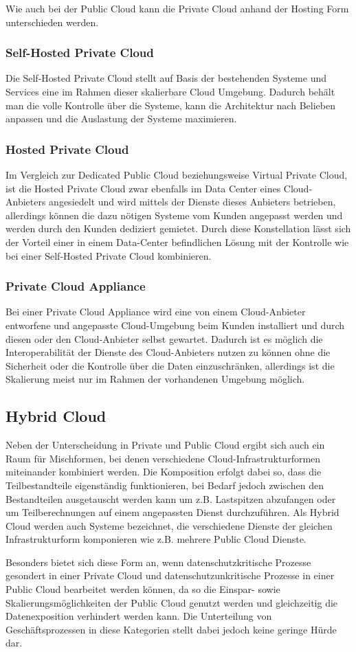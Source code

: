 Wie auch bei der Public Cloud kann die Private Cloud anhand der Hosting Form unterschieden werden.

\subsubsection{Self-Hosted Private Cloud}
Die Self-Hosted Private Cloud stellt auf Basis der bestehenden Systeme und Services eine im Rahmen dieser skalierbare Cloud Umgebung. Dadurch behält man die volle Kontrolle über die Systeme, kann die Architektur nach Belieben anpassen und die Auslastung der Systeme maximieren.

\subsubsection{Hosted Private Cloud}
Im Vergleich zur Dedicated Public Cloud beziehungsweise Virtual Private Cloud, ist die Hosted Private Cloud zwar ebenfalls im Data Center eines Cloud-Anbieters angesiedelt und wird mittels der Dienste dieses Anbieters betrieben, allerdings können die dazu nötigen Systeme vom Kunden angepasst werden und werden durch den Kunden dediziert gemietet. Durch diese Konstellation lässt sich der Vorteil einer in einem Data-Center befindlichen Lösung mit der Kontrolle wie bei einer Self-Hosted Private Cloud kombinieren.

\subsubsection{Private Cloud Appliance}
Bei einer Private Cloud Appliance wird eine von einem Cloud-Anbieter entworfene und angepasste Cloud-Umgebung beim Kunden installiert und durch diesen oder den Cloud-Anbieter selbst gewartet. Dadurch ist es möglich die Interoperabilität der Dienste des Cloud-Anbieters nutzen zu können ohne die Sicherheit oder die Kontrolle über die Daten einzuschränken, allerdings ist die Skalierung meist nur im Rahmen der vorhandenen Umgebung möglich.

\subsection{Hybrid Cloud}
Neben der Unterscheidung in Private und Public Cloud ergibt sich auch ein Raum für Mischformen, bei denen verschiedene Cloud-Infrastrukturformen miteinander kombiniert werden. Die Komposition erfolgt dabei so, dass die Teilbestandteile eigenständig funktionieren, bei Bedarf jedoch zwischen den Bestandteilen ausgetauscht werden kann um z.B. Lastspitzen abzufangen oder um Teilberechnungen auf einem angepassten Dienst durchzuführen. Als Hybrid Cloud werden auch Systeme bezeichnet, die verschiedene Dienste der gleichen Infrastrukturform komponieren wie z.B. mehrere Public Cloud Dienste.

Besonders bietet sich diese Form an, wenn datenschutzkritische Prozesse gesondert in einer Private Cloud und datenschutzunkritische Prozesse in einer Public Cloud bearbeitet werden können, da so die Einspar- sowie Skalierungsmöglichkeiten der Public Cloud genutzt werden und gleichzeitig die Datenexposition verhindert werden kann. Die Unterteilung von Geschäftsprozessen in diese Kategorien stellt dabei jedoch keine geringe Hürde dar. \cite{technet}